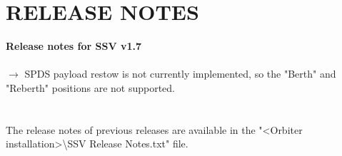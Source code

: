 \documentclass[Space_Shuttle_Vessel_Manual.tex]{subfiles}
\begin{document}
\section{RELEASE NOTES}
\label{sec:release-notes}
\noindent
\textbf{Release notes for SSV v1.7}\\\\
$\rightarrow$ SPDS payload restow is not currently implemented, so the "Berth" and "Reberth" positions are not supported.\\
\\
\\
The release notes of previous releases are available in the "<Orbiter installation>\textbackslash SSV Release Notes.txt" file.
\end{document}
